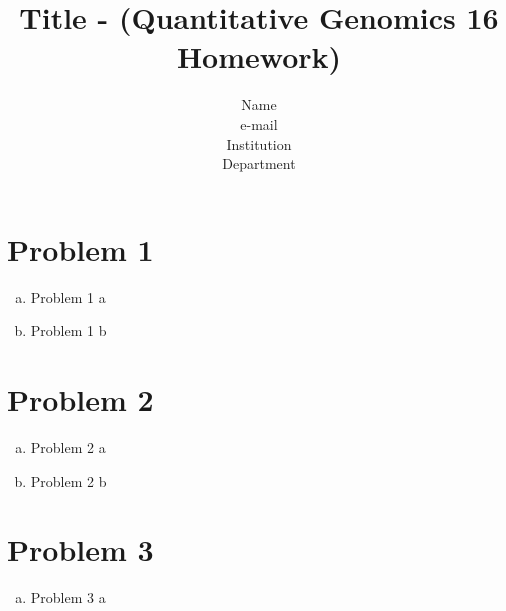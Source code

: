 \documentclass{article}
\begin{document}
\title{Title - (Quantitative Genomics 16 Homework)}

\author{Name \\ e-mail \\ Institution \\ Department}


\maketitle

\section*{Problem 1}


	\begin{enumerate}[(a)]
	\item Problem 1 a
	
	\item Problem 1 b 
	
	
	\end{enumerate}
	
\section*{Problem 2}
	\begin{enumerate}[(a)]
	\item Problem 2 a \\

	\item Problem 2 b\\
	
	\end{enumerate}
	
\section*{Problem 3}
	\begin{enumerate}[(a)]
		\item Problem 3 a 
		
		
	\end{enumerate}
\end{document}
